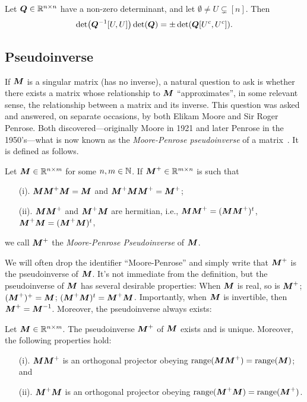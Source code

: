 \begin{lemma}
	\label{lem:sylvester}
	Let $\vb*{Q}\in\mathbb{R}^{n\times n}$ have a non-zero determinant, and let $\emptyset\neq U\subsetneq[n]$. Then 
	\begin{equation}
	\label{eq:sylvester}
	\det(\vb*{Q}^{-1}[U,U]) \det(\vb*{Q}) = \pm \det(\vb*{Q}[U^c,U^c]). 
	\end{equation}
\end{lemma}



\subsection{Pseudoinverse}
\label{sec:background_pseudoinverse}

If ${\vb*{M}}$ is a singular matrix (has  no inverse), a natural question to ask is whether there exists a matrix whose relationship to ${\vb*{M}}$ ``approximates'', in some relevant sense, the relationship between a matrix and its inverse. This question  was asked and answered, on separate occasions, by both Elikam Moore and Sir Roger Penrose. Both discovered---originally Moore in 1921 and later Penrose in the 1950's---what is now known as the \emph{Moore-Penrose pseudoinverse} of a matrix~\cite{moore1920reciprocal, penrose1955generalized,penrose1956best}. It is defined as follows. 

\begin{definition}
\label{def:pseudoinverse}
Let ${\vb*{M}}\in\mathbb{R}^{n\times m}$ for some $n,m\in\mathbb{N}$. If  ${\vb*{M}}^+\in\mathbb{R}^{m\times n}$ is such that
\begin{enumerate}
    \item[(i).] ${\vb*{M}}{\vb*{M}}^+{\vb*{M}}={\vb*{M}}$ and ${\vb*{M}}^+{\vb*{M}}{\vb*{M}}^+={\vb*{M}}^+$;
    \item[(ii).] ${\vb*{M}}{\vb*{M}}^+$ and ${\vb*{M}}^+{\vb*{M}}$ are hermitian, i.e., ${\vb*{M}}{\vb*{M}}^+=({\vb*{M}}{\vb*{M}}^+)^t $, ${\vb*{M}}^+{\vb*{M}}=({\vb*{M}}^+{\vb*{M}})^t$, 
\end{enumerate}
we call ${\vb*{M}}^+$ the \emph{Moore-Penrose Pseudoinverse} of ${\vb*{M}}$. 
\end{definition}

We will often drop the identifier ``Moore-Penrose'' and simply write that ${\vb*{M}}^+$ is the pseudoinverse of ${\vb*{M}}$. It's not immediate from  the definition, but the pseudoinverse of ${\vb*{M}}$ has several desirable properties: When ${\vb*{M}}$ is real, so is ${\vb*{M}}^+$; $({\vb*{M}}^+)^+={\vb*{M}}$; $({\vb*{M}}^+{\vb*{M}})^t = {\vb*{M}}^+{\vb*{M}}$. Importantly, when ${\vb*{M}}$ is invertible, then ${\vb*{M}}^+={\vb*{M}}^{-1}$. Moreover, the pseudoinverse always exists: 

\begin{lemma}
	\label{lem:pseudoinverse_properties}
Let ${\vb*{M}}\in \mathbb{R}^{n\times m}$. The pseudoinverse  ${\vb*{M}}^+$ of ${\vb*{M}}$ exists and is unique. Moreover, the following properties hold: 
\begin{enumerate}
    \item[(i).] ${\vb*{M}}{\vb*{M}}^+$ is an orthogonal projector obeying $\textnormal{range}({\vb*{M}}{\vb*{M}}^+)=\textnormal{range}({\vb*{M}})$; and 
    \item[(ii).] ${\vb*{M}}^+{\vb*{M}}$ is an orthogonal projector obeying $\textnormal{range}({\vb*{M}}^+{\vb*{M}})=\textnormal{range}({\vb*{M}}^+)$. 
\end{enumerate}
\end{lemma}

